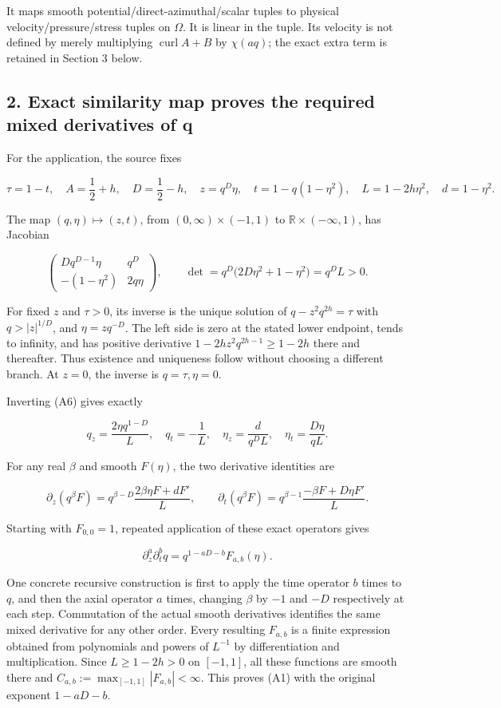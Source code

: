 \documentclass[10pt,a4paper]{article}
\begin{document}
It maps smooth potential/direct-azimuthal/scalar tuples to physical velocity/pressure/stress tuples on \(\Omega\). It is linear in the tuple. Its velocity is not defined by merely multiplying \(\operatorname{curl}A+B\) by \(\chi(aq)\); the exact extra term is retained in Section 3 below.

\subsection{2. Exact similarity map proves the required mixed derivatives of q}\label{exact-similarity-map-proves-the-required-mixed-derivatives-of-q}

For the application, the source fixes

\[
\tau=1-t,\quad A=\frac12+h,\quad D=\frac12-h,\quad
z=q^D\eta,\quad t=1-q(1-\eta^2),\quad
L=1-2h\eta^2,\quad d=1-\eta^2.
\tag{A5}
\]

The map \((q,\eta)\mapsto(z,t)\), from \((0,\infty)\times(-1,1)\) to \(\mathbb R\times(-\infty,1)\), has Jacobian

\[
\begin{pmatrix}
Dq^{D-1}\eta&q^D\\
-(1-\eta^2)&2q\eta
\end{pmatrix},\qquad
\det=q^D\big(2D\eta^2+1-\eta^2\big)=q^DL>0.
\tag{A6}
\]

For fixed \(z\) and \(\tau>0\), its inverse is the unique solution of \(q-z^2q^{2h}=\tau\) with \(q>|z|^{1/D}\), and \(\eta=zq^{-D}\). The left side is zero at the stated lower endpoint, tends to infinity, and has positive derivative \(1-2hz^2q^{2h-1}\ge1-2h\) there and thereafter. Thus existence and uniqueness follow without choosing a different branch. At \(z=0\), the inverse is \(q=\tau,\eta=0\).

Inverting (A6) gives exactly

\[
q_z=\frac{2\eta q^{1-D}}L,\quad q_t=-\frac1L,\quad
\eta_z=\frac{d}{q^DL},\quad \eta_t=\frac{D\eta}{qL}.
\tag{A7}
\]

For any real \(\beta\) and smooth \(F(\eta)\), the two derivative identities are

\[
\partial_z(q^\beta F)
=q^{\beta-D}\frac{2\beta\eta F+dF'}L,
\qquad
\partial_t(q^\beta F)
=q^{\beta-1}\frac{-\beta F+D\eta F'}L.
\tag{A8}
\]

Starting with \(F_{0,0}=1\), repeated application of these exact operators gives

\[
\partial_z^a\partial_t^bq=q^{1-aD-b}F_{a,b}(\eta).
\tag{A9}
\]

One concrete recursive construction is first to apply the time operator \(b\) times to \(q\), and then the axial operator \(a\) times, changing \(\beta\) by \(-1\) and \(-D\) respectively at each step. Commutation of the actual smooth derivatives identifies the same mixed derivative for any other order. Every resulting \(F_{a,b}\) is a finite expression obtained from polynomials and powers of \(L^{-1}\) by differentiation and multiplication. Since \(L\ge1-2h>0\) on \([-1,1]\), all these functions are smooth there and \(C_{a,b}:=\max_{[-1,1]}|F_{a,b}|<\infty\). This proves (A1) with the original exponent \(1-aD-b\).
\end{document}
